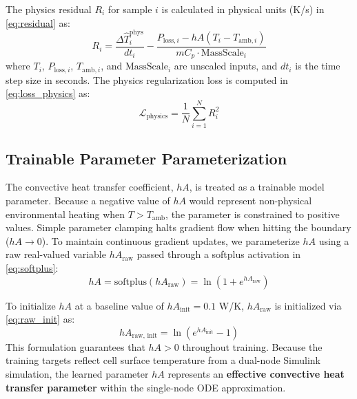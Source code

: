 The physics residual $R_i$ for sample $i$ is calculated in physical units (K/s) in \eqref{eq:residual} as:
\begin{equation}
R_i = \frac{\Delta \hat{T}_i^{\text{phys}}}{dt_i} - \frac{P_{\text{loss}, i} - hA (T_i - T_{\text{amb}, i})}{m C_p \cdot \text{MassScale}_i}
\label{eq:residual}
\end{equation}
where $T_i$, $P_{\text{loss}, i}$, $T_{\text{amb}, i}$, and $\text{MassScale}_i$ are unscaled inputs, and $dt_i$ is the time step size in seconds. The physics regularization loss is computed in \eqref{eq:loss_physics} as:
\begin{equation}
\mathcal{L}_{\text{physics}} = \frac{1}{N} \sum_{i=1}^N R_i^2
\label{eq:loss_physics}
\end{equation}

\subsection{Trainable Parameter Parameterization}
The convective heat transfer coefficient, $hA$, is treated as a trainable model parameter. Because a negative value of $hA$ would represent non-physical environmental heating when $T > T_{\text{amb}}$, the parameter is constrained to positive values. Simple parameter clamping halts gradient flow when hitting the boundary ($hA \to 0$). To maintain continuous gradient updates, we parameterize $hA$ using a raw real-valued variable $hA_{\text{raw}}$ passed through a softplus activation in \eqref{eq:softplus}:
\begin{equation}
hA = \text{softplus}(hA_{\text{raw}}) = \ln(1 + e^{hA_{\text{raw}}})
\label{eq:softplus}
\end{equation}

To initialize $hA$ at a baseline value of $hA_{\text{init}} = 0.1$ W/K, $hA_{\text{raw}}$ is initialized via \eqref{eq:raw_init} as:
\begin{equation}
hA_{\text{raw, init}} = \ln(e^{hA_{\text{init}}} - 1)
\label{eq:raw_init}
\end{equation}
This formulation guarantees that $hA > 0$ throughout training. Because the training targets reflect cell surface temperature from a dual-node Simulink simulation, the learned parameter $hA$ represents an \textbf{effective convective heat transfer parameter} within the single-node ODE approximation.
